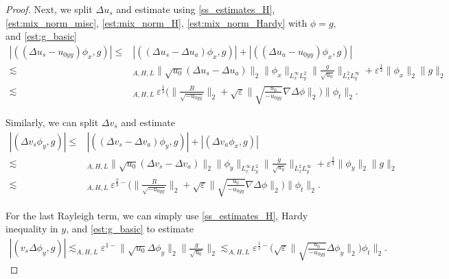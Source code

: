 \documentclass[reqno, 11pt]{amsart}
\theoremstyle{plain}
\theoremstyle{definition}
\theoremstyle{remark}
\numberwithin{equation}{section}
\begin{document}
\begin{proof}
Next, we split $\Delta u_s$ and estimate using \eqref{ss_estimates_H}, \eqref{est:mix_norm_misc}, \eqref{est:mix_norm_H}, \eqref{est:mix_norm_Hardy} with $\phi = g$, and \eqref{est:g_basic}
\begin{equation}\label{Dual_4}
\begin{aligned}
|((\Delta u_s - u_{0yy}) \phi_x, g)| \le& |((\Delta u_s - \Delta u_a) \phi_x, g) | + |((\Delta u_a - u_{0yy}) \phi_x, g) |\\
\lesssim&_{A,H,L} \| \sqrt{u_0} (\Delta u_s - \Delta u_a)\|_2 \| \phi_x\|_{L^\infty_x L^2_y} \| \frac{g}{\sqrt{u_0}}\|_{L^2_x L^\infty_y} + \varepsilon^{\frac{1}{3}}\|\phi_x\|_2\|g\|_2\\
\lesssim&_{A,H,L}~ \varepsilon^{\frac{1}{3}}  \Big( \|\frac{R}{\sqrt{-u_{0yy}}}\|_2 + \sqrt{\varepsilon} \| \sqrt{\frac{u_0}{-u_{0yy}}} \nabla \Delta \phi\|_2\Big) \|\phi_t\|_2.
\end{aligned}
\end{equation}

Similarly, we can split $\Delta v_s$ and estimate
\begin{equation}\label{Dual_5}
\begin{aligned}
|(\Delta v_s \phi_y, g)| \le& |((\Delta v_s - \Delta v_a) \phi_y, g) | + |(\Delta v_a  \phi_x, g) |\\
\lesssim&_{A,H,L} \| \sqrt{u_0} (\Delta v_s - \Delta v_a)\|_2 \| \phi_y\|_{L^\infty_x L^2_y} \| \frac{g}{\sqrt{u_0}}\|_{L^2_x L^\infty_y} + \varepsilon^{\frac{2}{3}}\|\phi_y\|_2\|g\|_2\\
\lesssim&_{A,H,L}~ \varepsilon^{\frac{2}{3}-}  \Big( \|\frac{R}{\sqrt{-u_{0yy}}}\|_2 + \sqrt{\varepsilon} \| \sqrt{\frac{u_0}{-u_{0yy}}} \nabla \Delta \phi\|_2\Big) \|\phi_t\|_2.
\end{aligned}
\end{equation}

For the last Rayleigh term, we can simply use \eqref{ss_estimates_H}, Hardy inequality in $y$, and \eqref{est:g_basic} to estimate
\begin{equation}\label{Dual_6}
\begin{aligned}
|( v_s \Delta\phi_y, g)| \lesssim_{A,H,L} \varepsilon^{1-} \| \sqrt{u_0} \Delta \phi_y\|_2\| \frac{g}{\sqrt{u_0}}\|_2 \lesssim_{A,H,L} \varepsilon^{\frac{1}{2}-} \Big( \sqrt{\varepsilon} \| \sqrt{\frac{u_0}{-u_{0yy}}}  \Delta \phi_y\|_2\Big)\phi_t\|_2.
\end{aligned}
\end{equation}


\end{proof}
\end{document}
